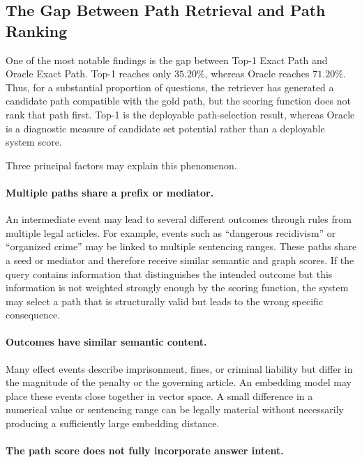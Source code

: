 \subsection{The Gap Between Path Retrieval and Path Ranking}

One of the most notable findings is the gap between Top-1 Exact Path and
Oracle Exact Path. Top-1 reaches only \(35.20\%\), whereas Oracle reaches
\(71.20\%\). Thus, for a substantial proportion of questions, the retriever
has generated a candidate path compatible with the gold path, but the
scoring function does not rank that path first. Top-1 is the deployable
path-selection result, whereas Oracle is a diagnostic measure of candidate
set potential rather than a deployable system score.

Three principal factors may explain this phenomenon.

\paragraph{Multiple paths share a prefix or mediator.}

An intermediate event may lead to several different outcomes through rules
from multiple legal articles. For example, events such as ``dangerous
recidivism'' or ``organized crime'' may be linked to multiple sentencing
ranges. These paths share a seed or mediator and therefore receive similar
semantic and graph scores. If the query contains information that
distinguishes the intended outcome but this information is not weighted
strongly enough by the scoring function, the system may select a path that
is structurally valid but leads to the wrong specific consequence.

\paragraph{Outcomes have similar semantic content.}

Many effect events describe imprisonment, fines, or criminal liability but
differ in the magnitude of the penalty or the governing article. An
embedding model may place these events close together in vector space. A
small difference in a numerical value or sentencing range can be legally
material without necessarily producing a sufficiently large embedding
distance.

\paragraph{The path score does not fully incorporate answer intent.}

